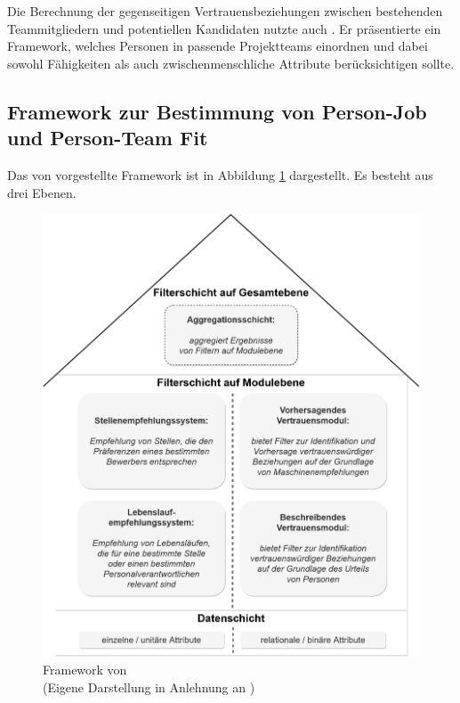 Die Berechnung der gegenseitigen Vertrauensbeziehungen zwischen bestehenden Teammitgliedern und potentiellen Kandidaten nutzte auch \textcite[S. 1ff.]{keim:2007}. Er präsentierte ein Framework, welches Personen in passende Projektteams einordnen und dabei sowohl Fähigkeiten als auch zwischenmenschliche Attribute berücksichtigen sollte.

\subsection{Framework zur Bestimmung von Person-Job und Person-Team Fit}
\label{ch:verwandteArbeiten:aufDemPEFitBasierendeBilateraleSysteme:pjUndPtFit}
Das von \textcite[S. 1ff.]{keim:2007} vorgestellte Framework ist in Abbildung \ref{fig:verwandteArbeiten:abb3} dargestellt. Es besteht aus drei Ebenen.

\begin{figure}[h]
	\centering
	\includegraphics[width=1\textwidth]{gfx/keim-multilayer.jpg}
	\caption{Framework von \textcite[S. 5]{keim:2007}\\
	(Eigene Darstellung in Anlehnung an \cite[S. 5]{keim:2007})}
	\label{fig:verwandteArbeiten:abb3}
\end{figure}

